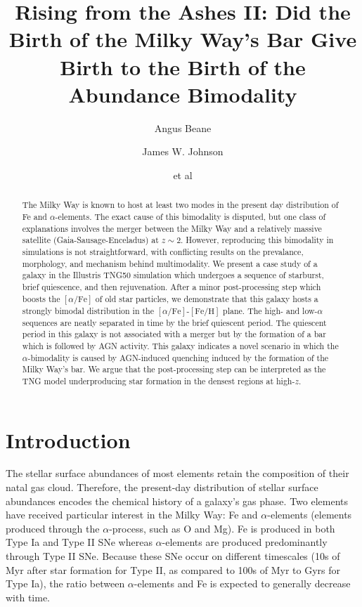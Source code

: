 \documentclass[linenumbers, twocolumn]{aastex631}
\newcommand{\FeH}{\ensuremath{[\textrm{Fe}/\textrm{H}]}}
\newcommand{\alphaFe}{\ensuremath{[\alpha/\textrm{Fe}]}}
\begin{document}
\title{Rising from the Ashes II: Did the Birth of the Milky Way's Bar Give Birth to the Birth of the Abundance Bimodality}

\author{Angus Beane}

\author{James W. Johnson}

\author{et al}

\begin{abstract}
    The Milky Way is known to host at least two modes in the present day distribution of Fe and $\alpha$-elements. The exact cause of this bimodality is disputed, but one class of explanations involves the merger between the Milky Way and a relatively massive satellite (Gaia-Sausage-Enceladus) at $z\sim2$. However, reproducing this bimodality in simulations is not straightforward, with conflicting results on the prevalance, morphology, and mechanism behind multimodality. We present a case study of a galaxy in the Illustris TNG50 simulation which undergoes a sequence of starburst, brief quiescence, and then rejuvenation. After a minor post-processing step which boosts the \alphaFe{} of old star particles, we demonstrate that this galaxy hosts a strongly bimodal distribution in the \alphaFe{}-\FeH{} plane. The high- and low-$\alpha$ sequences are neatly separated in time by the brief quiescent period. The quiescent period in this galaxy is not associated with a merger but by the formation of a bar which is followed by AGN activity. This galaxy indicates a novel scenario in which the $\alpha$-bimodality is caused by AGN-induced quenching induced by the formation of the Milky Way's bar. We argue that the post-processing step can be interpreted as the TNG model underproducing star formation in the densest regions at high-$z$.
  \end{abstract}
    
  

\section{Introduction}\label{sec:intro}
The stellar surface abundances of most elements retain the composition of their natal gas cloud. Therefore, the present-day distribution of stellar surface abundances encodes the chemical history of a galaxy's gas phase. Two elements have received particular interest in the Milky Way: Fe and $\alpha$-elements (elements produced through the $\alpha$-process, such as O and Mg). Fe is produced in both Type Ia and Type II SNe whereas $\alpha$-elements are produced predominantly through Type II SNe. Because these SNe occur on different timescales (10s of Myr after star formation for Type II, as compared to 100s of Myr to Gyrs for Type Ia), the ratio between $\alpha$-elements and Fe is expected to generally decrease with time.
\end{document}
